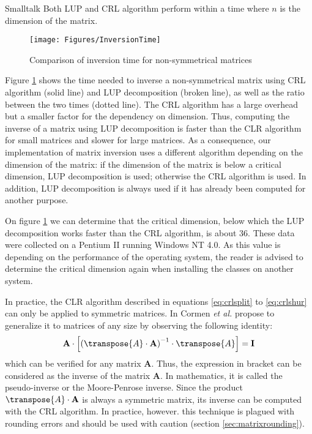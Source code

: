 \begin{displaycode}{Smalltalk}
Both LUP and CRL algorithm perform within a time  where
$n$ is the dimension of the matrix.
\begin{figure}
\centering\texttt{[image: Figures/InversionTime]}
\caption{Comparison of inversion time for non-symmetrical
matrices}\label{fig:inversionTime}
\end{figure}
Figure \ref{fig:inversionTime} shows the time needed to inverse a
non-symmetrical matrix using CRL algorithm (solid line) and LUP
decomposition (broken line), as well as the ratio between the two
times (dotted line). The CRL algorithm has a large overhead but a
smaller factor for the dependency on dimension. Thus, computing
the inverse of a matrix using LUP decomposition is faster than the
CLR algorithm for small matrices and slower for large matrices. As
a consequence, our implementation of matrix inversion uses a
different algorithm depending on the dimension of the matrix: if
the dimension of the matrix is below a critical dimension, LUP
decomposition is used; otherwise the CRL algorithm is used. In
addition, LUP decomposition is always used if it has already been
computed for another purpose.

On figure \ref{fig:inversionTime} we can determine that the
critical dimension, below which the LUP decomposition works faster
than the CRL algorithm, is about $36$. These data were collected on
a Pentium II running Windows NT 4.0. As this value is depending on
the performance of the operating system, the reader is advised to
determine the critical dimension again when installing the classes
on another system.

In practice, the CLR algorithm described in equations
\ref{eq:crlsplit} to \ref{eq:crlshur} can only be applied to
symmetric matrices. In \cite{CorLeiRiv} Cormen \textit{et al.}
propose to generalize it to matrices of any size by observing the
following identity:
\begin{equation}
\label{eq:pseudoinverse}
  \textbf{A}\cdot\left[\left(\transpose{A}\cdot\textbf{A}\right)^{-1}\cdot\transpose{A}\right]=\textbf{I}
\end{equation}
which can be verified for any matrix $\textbf{A}$. Thus, the
expression in bracket can be considered as the inverse of the
matrix $\textbf{A}$. In mathematics, it is called the pseudo-inverse
or the Moore-Penrose inverse. Since the product
$\transpose{A}\cdot\textbf{A}$ is always a symmetric matrix, its
inverse can be computed with the CRL algorithm. In practice,
however. this technique is plagued with rounding errors and should
be used with caution (\cf section \ref{sec:matrixrounding}).


\end{displaycode}
